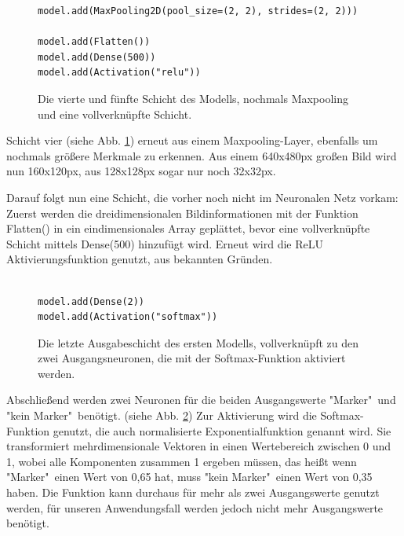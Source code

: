 \documentclass[conference]{IEEEtran}
\begin{document}
	\begin{figure}[!h]
		\centering
		\begin{verbatim}
model.add(MaxPooling2D(pool_size=(2, 2), strides=(2, 2)))

model.add(Flatten())
model.add(Dense(500))
model.add(Activation("relu"))
		\end{verbatim}
		\caption{Die vierte und fünfte Schicht des Modells, nochmals Maxpooling und eine vollverknüpfte Schicht.}
		\label{erstes Modell: Schicht vier und fünf}
	\end{figure}

	Schicht vier (siehe Abb. \ref{erstes Modell: Schicht vier und fünf}) erneut aus einem Maxpooling-Layer, ebenfalls um nochmals größere Merkmale zu erkennen.
	Aus einem 640x480px großen Bild wird nun 160x120px, aus 128x128px sogar nur noch 32x32px.
	
	Darauf folgt nun eine Schicht, die vorher noch nicht im Neuronalen Netz vorkam:
	Zuerst werden die dreidimensionalen Bildinformationen mit der Funktion 
	Flatten() in ein eindimensionales Array geplättet, bevor eine 
	vollverknüpfte Schicht mittels Dense(500) hinzufügt wird.
	Erneut wird die ReLU Aktivierungsfunktion genutzt, aus bekannten 
	Gründen.

	\begin{figure}[!h]
		\centering
		\begin{verbatim}

model.add(Dense(2))
model.add(Activation("softmax"))
		\end{verbatim}
		\caption{Die letzte Ausgabeschicht des ersten Modells, vollverknüpft zu den zwei Ausgangsneuronen, die mit der Softmax-Funktion aktiviert werden.}
		\label{erstes Modell: Schicht sechs}
	\end{figure}

	Abschließend werden zwei Neuronen für die beiden Ausgangswerte 
	"Marker"\ und "kein Marker"\ benötigt. (siehe Abb. \ref{erstes Modell: Schicht sechs})
	Zur Aktivierung wird die Softmax-Funktion genutzt, die auch 
	normalisierte Exponentialfunktion genannt wird.
	Sie transformiert mehrdimensionale Vektoren in einen Wertebereich zwischen 0 und 1, wobei alle Komponenten zusammen 1 ergeben müssen, das heißt wenn "Marker"\ einen Wert von 0,65 hat, muss "kein Marker"\ einen Wert von 0,35 haben. 
	Die Funktion kann durchaus für mehr als zwei Ausgangswerte genutzt werden, für unseren Anwendungsfall werden jedoch nicht mehr Ausgangswerte benötigt.
	
\end{document}
